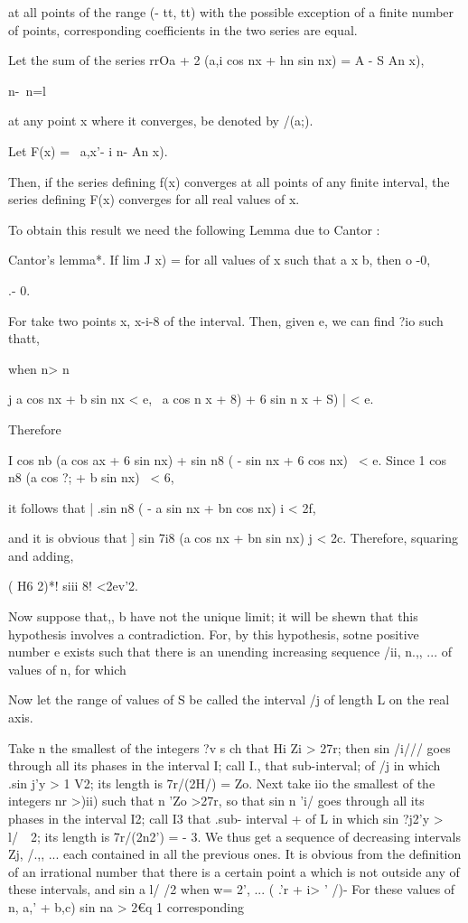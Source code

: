 at all points of the range (- tt, tt) with the possible exception of a
finite number of points, corresponding coefficients in the two series
are equal.


Let the sum of the series rrOa + 2 (a,i cos nx + hn sin nx) = A - S An
x),

  n-\ n=l

at any point x where it converges, be denoted by /(a;).

Let F(x) = \ a,x'- i n- An x).

Then, if the series defining f(x) converges at all points of any
finite interval, the series defining F(x) converges for all real
values of x.

To obtain this result we need the following Lemma due to Cantor :

Cantor's lemma*. If lim J x) = for all values of x such that a x b,
then o -0,

 .- 0.

For take two points x, x-i-8 of the interval. Then, given e, we can
find ?io such thatt,

when n> n

j a cos nx + b sin nx < e, \ a cos n x + 8) + 6 sin n x + S) | < e.

Therefore

I cos nb (a cos ax + 6 sin nx) + sin n8 ( - sin nx + 6 cos nx) \ < e.
Since 1 cos n8 (a cos ?; + b sin nx) \ < 6,

it follows that | .sin n8 ( - a sin nx + bn cos nx) i < 2f,

and it is obvious that ] sin 7i8 (a cos nx + bn sin nx) j < 2c.
Therefore, squaring and adding,

( H6 2)*! siii 8! <2ev'2.

Now suppose that,, b have not the unique limit; it will be shewn
that this hypothesis involves a contradiction. For, by this
hypothesis, sotne positive number e exists such that there is an
unending increasing sequence /ii, n.,, ... of values of n, for which

Now let the range of values of S be called the interval /j of length L
on the real axis.

Take n the smallest of the integers ?v s ch that Hi Zi > 27r; then
sin /i/// goes through all its phases in the interval I; call I.,
that sub-interval; of /j in which .sin j'y > 1 V2; its length is
7r/(2H/) = Zo. Next take iio the smallest of the integers nr >)ii)
such that n 'Zo >27r, so that sin n 'i/ goes through all its phases in
the interval I2; call I3 that .sub- interval + of L in which sin ?j2'y
> l/\ \ 2; its length is 7r/(2n2') = - 3. We thus get a sequence of
decreasing intervals Zj, /.,, ... each contained in all the previous
ones. It is obvious from the definition of an irrational number that
there is a certain point a which is not outside any of these
intervals, and sin a l/ /2 when w= 2', ... ( .'r + i> ' /)- For these
values of n, a,' + b,c) sin na > 2€q 1%
corresponding

